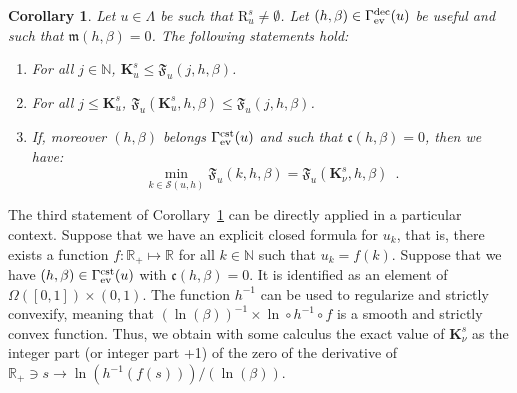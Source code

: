 \documentclass{article}
\def\funset{\Gamma}
\def\fmong{\funset_{{\rm ev}}^{\rm dec}}
\def\fset{\Omega([0,1])}
\def\fcste{\funset_{{\rm ev}}^{\rm cst}}
\def\mon{\mathfrak{m}}
\def\cst{\mathfrak{c}}
\def\Fu{\mathfrak{F}_u}
\def\rr{\mathbb R}
\def\nn{\mathbb N}
\def\bigks{\mathbf{K}^s}
\def\gls#1{{\mathrm R}_{#1}}
\def\gsls#1{\gls{#1}^s}
\def\res{\mathcal{S}}
\newtheorem{coro}{Corollary}
\def\red#1{#1}
\def\blue#1{#1}
\begin{document}
	\begin{coro}
		\label{intercst}
		Let $u\in\Lambda$ \blue{be such that} $\gsls{u}\neq \emptyset$. \blue{Let $(h,\beta)\in\fmong(u)$ be useful and such that $\mon(h,\beta)=0$}. The following statements hold:
		\begin{enumerate}
			\item For all $j\in\nn$, $\bigks_u\leq \Fu(j,h,\beta)$.
			\item For all $j\leq \bigks_u$, $\Fu(\bigks_u,h,\beta)\leq \Fu(j,h,\beta)$.
			\item If, moreover \blue{$(h,\beta)$ belongs $\fcste(u)$ and such that $\cst(h,\beta)=0$}, then we have: 
			\[
			\min_{k\in\res(u,h)} \Fu(k,h,\beta)=\Fu(\bigks_\nu,h,\beta)\enspace .
			\]
		\end{enumerate}
	\end{coro}
	The third statement of Corollary~\ref{intercst} can be directly \red{applied} in a particular context. Suppose that we have an explicit closed formula for $u_k$, that is, there exists a function $f:\rr_+\mapsto \rr$ for all $k\in\nn$ such that $u_k=f(k)$. Suppose that we have \blue{$(h,\beta)\in\fcste(u)$ with $\cst(h,\beta)=0$. It} is identified as an element of $\fset\times (0,1)$. The function $h^{-1}$ \red{can} be used to regularize and strictly convexify, meaning that $(\ln(\beta))^{-1}\times \ln\circ h^{-1}\circ f$ is \red{a} smooth and strictly convex \red{function}. \red{Thus, we} obtain with some calculus the exact value of $\bigks_\nu$ as the integer part (or integer part +1) of the zero of the derivative of $\rr_+\ni s\to \ln(h^{-1}(f(s)))/(\ln(\beta))$.    
	
\end{document}
